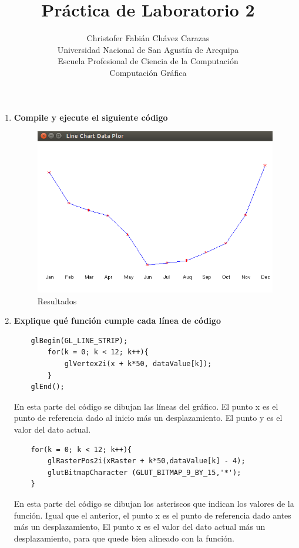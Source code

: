 \documentclass[a4paper,12pt]{article}
\begin{document}
\title{Práctica de Laboratorio 2}
\author{
Christofer Fabián Chávez Carazas \\
\small{Universidad Nacional de San Agustín de Arequipa} \\
\small{Escuela Profesional de Ciencia de la Computación} \\
\small{Computación Gráfica}
}
\date{}

\maketitle

\begin{enumerate}
 \item \textbf{Compile y ejecute el siguiente código}

\begin{figure}[H]
 \centering
 \includegraphics[scale = 0.5]{1.png}
 \caption{Resultados}
\end{figure}

 \item \textbf{Explique qué función cumple cada línea de código}
 
 \begin{lstlisting}
    glBegin(GL_LINE_STRIP);
        for(k = 0; k < 12; k++){
            glVertex2i(x + k*50, dataValue[k]);
        }
    glEnd();  
 \end{lstlisting}
 En esta parte del código se dibujan las líneas del gráfico. El punto x es el punto de referencia dado al inicio más un desplazamiento. El punto y
 es el valor del dato actual.
 
 \begin{lstlisting}
    for(k = 0; k < 12; k++){
        glRasterPos2i(xRaster + k*50,dataValue[k] - 4);
        glutBitmapCharacter (GLUT_BITMAP_9_BY_15,'*');
    }
 \end{lstlisting}
 En esta parte del código se dibujan los asteriscos que indican los valores de la función. Igual que el anterior, el punto x es el punto de referencia dado antes más un
 desplazamiento, El punto x es el valor del dato actual más un desplazamiento, para que quede bien alineado con la función.
 

\end{enumerate}
\end{document}
